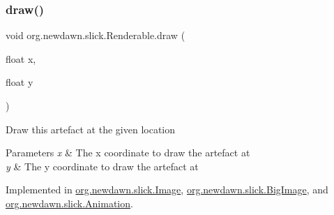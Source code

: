 \subsubsection{\texorpdfstring{draw()}{draw()}}
{\footnotesize\ttfamily void org.\+newdawn.\+slick.\+Renderable.\+draw (\begin{DoxyParamCaption}\item[{float}]{x,  }\item[{float}]{y }\end{DoxyParamCaption})}

Draw this artefact at the given location


\begin{DoxyParams}{Parameters}
{\em x} & The x coordinate to draw the artefact at \\
\hline
{\em y} & The y coordinate to draw the artefact at \\
\hline
\end{DoxyParams}


Implemented in \mbox{\hyperlink{classorg_1_1newdawn_1_1slick_1_1_image_a47a2d7ef96a03050ac9718d2c22129e6}{org.\+newdawn.\+slick.\+Image}}, \mbox{\hyperlink{classorg_1_1newdawn_1_1slick_1_1_big_image_a94aa674e521e409c45afcfd627b49772}{org.\+newdawn.\+slick.\+Big\+Image}}, and \mbox{\hyperlink{classorg_1_1newdawn_1_1slick_1_1_animation_a37ae4bfbc6158fade8e1e7efdde039af}{org.\+newdawn.\+slick.\+Animation}}.

